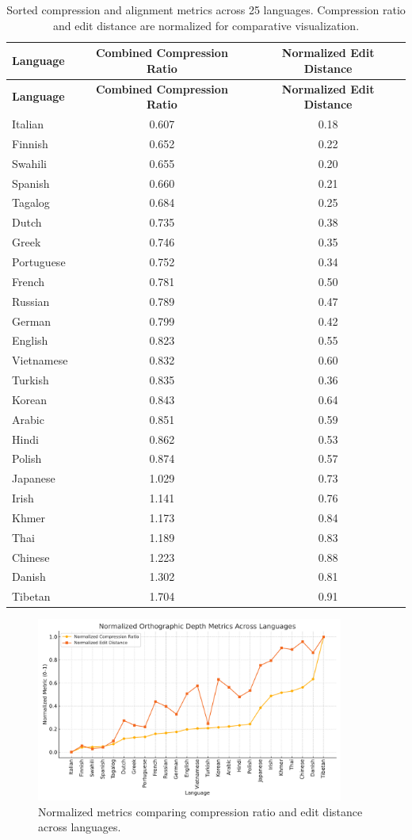 \documentclass[12pt]{article}
\begin{document}
\begin{longtable}{lcc}
\caption{Sorted compression and alignment metrics across 25 languages. Compression ratio and edit distance are normalized for comparative visualization.}
\label{tab:results}\\
\toprule
\textbf{Language} & \textbf{Combined Compression Ratio} & \textbf{Normalized Edit Distance} \\
\midrule
\endfirsthead
\toprule
\textbf{Language} & \textbf{Combined Compression Ratio} & \textbf{Normalized Edit Distance} \\
\midrule
\endhead
Italian & 0.607 & 0.18 \\
Finnish & 0.652 & 0.22 \\
Swahili & 0.655 & 0.20 \\
Spanish & 0.660 & 0.21 \\
Tagalog & 0.684 & 0.25 \\
Dutch & 0.735 & 0.38 \\
Greek & 0.746 & 0.35 \\
Portuguese & 0.752 & 0.34 \\
French & 0.781 & 0.50 \\
Russian & 0.789 & 0.47 \\
German & 0.799 & 0.42 \\
English & 0.823 & 0.55 \\
Vietnamese & 0.832 & 0.60 \\
Turkish & 0.835 & 0.36 \\
Korean & 0.843 & 0.64 \\
Arabic & 0.851 & 0.59 \\
Hindi & 0.862 & 0.53 \\
Polish & 0.874 & 0.57 \\
Japanese & 1.029 & 0.73 \\
Irish & 1.141 & 0.76 \\
Khmer & 1.173 & 0.84 \\
Thai & 1.189 & 0.83 \\
Chinese & 1.223 & 0.88 \\
Danish & 1.302 & 0.81 \\
Tibetan & 1.704 & 0.91 \\
\bottomrule
\end{longtable}

\begin{figure}[h]
\centering
\includegraphics[width=0.9\textwidth]{depth_plot.pdf}
\caption{Normalized metrics comparing compression ratio and edit distance across languages.}
\label{fig:depthplot}
\end{figure}
\end{document}
